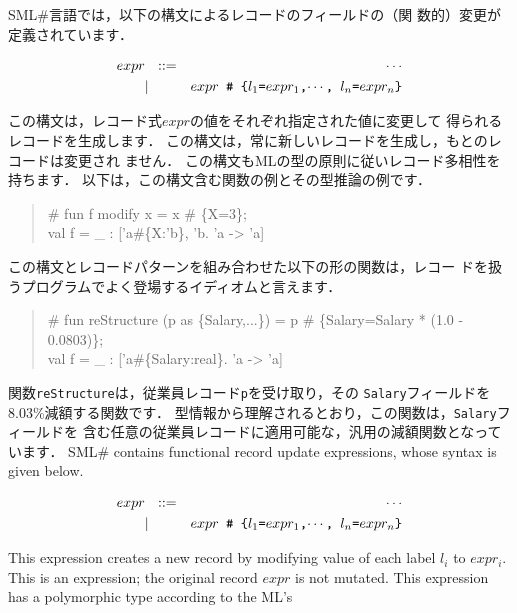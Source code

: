 \documentclass{jbook}
\newcommand{\smlsharp}{SML\#}
\begin{document}
\ifx\jp%
	\smlsharp{}言語では，以下の構文によるレコードのフィールドの（関
数的）変更が定義されています．
\begin{tt}
\begin{eqnarray*}
expr &\mbox{\ \ }::=& \cdots \\
     &|& \mbox{\tt $expr$ {\#} \{$l_1$=$expr_1$,$\cdots$, $l_n$=$expr_n$\}}
\end{eqnarray*}
\end{tt}
	この構文は，レコード式$expr$の値をそれぞれ指定された値に変更して
得られるレコードを生成します．
	この構文は，常に新しいレコードを生成し，もとのレコードは変更され
ません．
	この構文もMLの型の原則に従いレコード多相性を持ちます．
	以下は，この構文含む関数の例とその型推論の例です．
\begin{tt}\begin{quote}
\# fun f modify x = x \# \{X=3\};\\
val f = \_ : ['a\#\{X:'b\}, 'b.  'a -> 'a]
\end{quote}\end{tt}
	この構文とレコードパターンを組み合わせた以下の形の関数は，レコー
ドを扱うプログラムでよく登場するイディオムと言えます．
\begin{tt}\begin{quote}
\# fun reStructure (p as \{Salary,...\}) = p \# \{Salary=Salary * (1.0 - 0.0803)\};\\
val f = \_ : ['a\#\{Salary:real\}.  'a -> 'a]
\end{quote}\end{tt}
	関数{\tt reStructure}は，従業員レコード{\tt p}を受け取り，その
{\tt Salary}フィールドを8.03\%減額する関数です．
	型情報から理解されるとおり，この関数は，{\tt Salary}フィールドを
含む任意の従業員レコードに適用可能な，汎用の減額関数となっています．
\else%
	\smlsharp{} contains functional record update expressions, whose
syntax is given below.
\begin{tt}
\begin{eqnarray*}
expr &\mbox{\ \ }::=& \cdots \\
     &|& \mbox{\tt $expr$ {\#} \{$l_1$=$expr_1$,$\cdots$, $l_n$=$expr_n$\}}
\end{eqnarray*}
\end{tt}
	This expression creates a new record by modifying value of each
label $l_i$ to $expr_i$.
	This is an expression; the original record $expr$ is not
mutated.
	This expression has a polymorphic type according to the ML's
\end{document}
